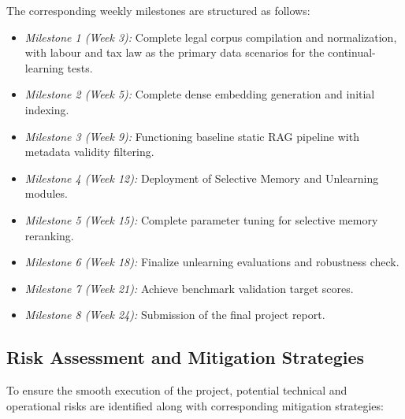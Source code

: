 The corresponding weekly milestones are structured as follows:
\begin{itemize}
    \item \textit{Milestone 1 (Week 3):} Complete legal corpus compilation and normalization, with labour and tax law as the primary data scenarios for the continual-learning tests.
    \item \textit{Milestone 2 (Week 5):} Complete dense embedding generation and initial indexing.
    \item \textit{Milestone 3 (Week 9):} Functioning baseline static RAG pipeline with metadata validity filtering.
    \item \textit{Milestone 4 (Week 12):} Deployment of Selective Memory and Unlearning modules.
    \item \textit{Milestone 5 (Week 15):} Complete parameter tuning for selective memory reranking.
    \item \textit{Milestone 6 (Week 18):} Finalize unlearning evaluations and robustness check.
    \item \textit{Milestone 7 (Week 21):} Achieve benchmark validation target scores.
    \item \textit{Milestone 8 (Week 24):} Submission of the final project report.
\end{itemize}

\subsection{Risk Assessment and Mitigation Strategies}
To ensure the smooth execution of the project, potential technical and operational risks are identified along with corresponding mitigation strategies:

